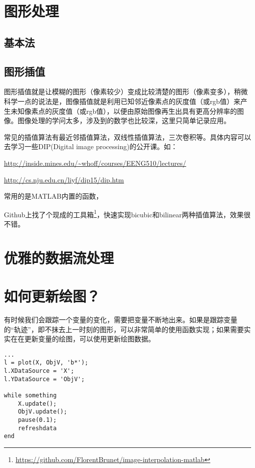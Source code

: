\section{图形处理}

\subsection{基本法}

\subsection{图形插值}

图形插值就是让模糊的图形（像素较少）变成比较清楚的图形（像素变多），稍微科学一点的说法是，图像插值就是利用已知邻近像素点的灰度值（或rgb值）来产生未知像素点的灰度值（或rgb值），以便由原始图像再生出具有更高分辨率的图像。图像处理的学问太多，涉及到的数学也比较深，这里只简单记录应用。

常见的插值算法有最近邻插值算法，双线性插值算法，三次卷积等。具体内容可以去学习一些DIP(Digital image processing)的公开课。如：

\url{http://inside.mines.edu/~whoff/courses/EENG510/lectures/}

\url{http://cs.nju.edu.cn/liyf/dip15/dip.htm}

常用的是MATLAB内置的函数，

Github上找了个现成的工具箱\footnote{\url{https://github.com/FlorentBrunet/image-interpolation-matlab}}，快速实现bicubic和bilinear两种插值算法，效果很不错。


\section{优雅的数据流处理}

\section{如何更新绘图？}

有时候我们会跟踪一个变量的变化，需要把变量不断地出来。如果是跟踪变量的“轨迹”，即不抹去上一时刻的图形，可以非常简单的使用函数实现；如果需要实实在在更新变量的绘图，可以使用更新绘图数据。

\begin{verbatim}
...
l = plot(X, ObjV, 'b*');
l.XDataSource = 'X';
l.YDataSource = 'ObjV';

while something
    X.update();
    ObjV.update();
    pause(0.1);
    refreshdata
end
\end{verbatim}

